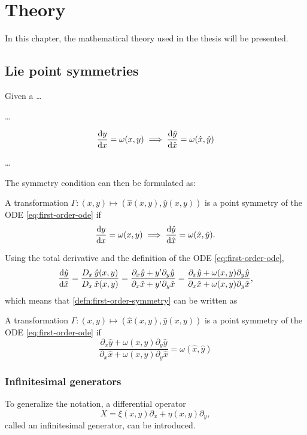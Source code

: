 \chapter{Theory}

In this chapter, the mathematical theory used in the thesis will be presented.

\section{Lie point symmetries}

Given a \dots

\dots

\begin{equation} \label{eq:first-order-ode}
  \dv{y}{x} = \omega(x,y)
  \implies
  \dv{\hat{y}}{\hat{x}} = \omega(\hat{x},\hat{y})
\end{equation}

\dots

The symmetry condition can then be formulated as: %
\begin{defn} \label{defn:first-order-symmetry}
  A transformation \(\Gamma: (x,y) \mapsto (\hat{x}(x,y), \hat{y}(x,y))\) is a point symmetry of the ODE \ref{eq:first-order-ode} if
  \begin{equation}
    \dv{y}{x} = \omega(x,y)
    \implies
    \dv{\hat{y}}{\hat{x}} = \omega(\hat{x},\hat{y}).
  \end{equation}
\end{defn}
Using the total derivative and the definition of the ODE \ref{eq:first-order-ode},
\begin{equation}
  \dv{\hat{y}}{\hat{x}} = 
  \frac{D_{x}\, \hat{y}(x,y)}{D_{x}\, \hat{x}(x,y)} =
  \frac{\partial_x \hat{y} + y' \partial_y \hat{y}}{\partial_x \hat{x} + y' \partial_y \hat{x}} =
  \frac{\partial_x \hat{y} + \omega(x,y) \partial_y \hat{y}}{\partial_x \hat{x} + \omega(x,y) \partial_y \hat{x}},
\end{equation}
which means that \cref{defn:first-order-symmetry} can be written as
\begin{lem}
  A transformation \(\Gamma: (x,y) \mapsto (\hat{x}(x,y), \hat{y}(x,y))\) is a point symmetry of the ODE \ref{eq:first-order-ode} if
  \begin{equation}
    \frac{\partial_x \hat{y} + \omega(x,y) \partial_y \hat{y}}{\partial_x \hat{x} + \omega(x,y) \partial_y \hat{x}} = \omega(\hat{x},\hat{y})
  \end{equation}
\end{lem}

\subsection{Infinitesimal generators}

To generalize the notation, a differential operator
\begin{equation}
  X = \xi(x,y) \partial_x + \eta(x,y) \partial_y,
\end{equation}
called an infinitesimal generator, can be introduced.